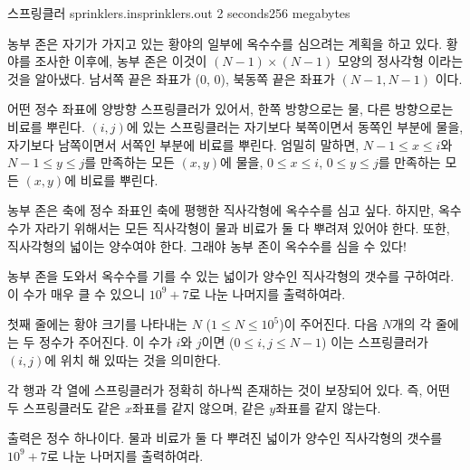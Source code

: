 \begin{problem}{스프링클러}
	{sprinklers.in}{sprinklers.out}
	{2 seconds}{256 megabytes}{}
	
	농부 존은 자기가 가지고 있는 황야의 일부에 옥수수를 심으려는 계획을 하고 있다. 황야를 조사한 이후에, 농부 존은 이것이 $(N-1) \times (N-1)$ 모양의 정사각형 이라는 것을 알아냈다. 남서쪽 끝은 좌표가 (0, 0), 북동쪽 끝은 좌표가 $(N-1, N-1)$ 이다.
	
	어떤 정수 좌표에 양방향 스프링클러가 있어서, 한쪽 방향으로는 물, 다른 방향으로는 비료를 뿌린다. $(i, j)$에 있는 스프링클러는 자기보다 북쪽이면서 동쪽인 부분에 물을, 자기보다 남쪽이면서 서쪽인 부분에 비료를 뿌린다. 엄밀히 말하면, $N-1 \le x \le i$와 $N-1 \le y \le j$를 만족하는 모든 $(x, y)$에 물을, $0 \le x \le i$, $0 \le y \le j$를 만족하는 모든 $(x, y)$에 비료를 뿌린다.
	
	
	농부 존은 축에 정수 좌표인 축에 평행한 직사각형에 옥수수를 심고 싶다. 하지만, 옥수수가 자라기 위해서는 모든 직사각형이 물과 비료가 둘 다 뿌려져 있어야 한다. 또한, 직사각형의 넓이는 양수여야 한다. 그래야 농부 존이 옥수수를 심을 수 있다!
	
	농부 존을 도와서 옥수수를 기를 수 있는 넓이가 양수인 직사각형의 갯수를 구하여라. 이 수가 매우 클 수 있으니 $10^9 + 7$로 나눈 나머지를 출력하여라.
	
	
	\InputFile
	
	첫째 줄에는 황야 크기를 나타내는 $N$ ($1 \le N \le 10^5$)이 주어진다. 다음 $N$개의 각 줄에는 두 정수가 주어진다. 이 수가 $i$와 $j$이면 ($0 \le i,j \le N-1$) 이는 스프링클러가 $(i, j)$에 위치 해 있따는 것을 의미한다.
	
	각 행과 각 열에 스프링클러가 정확히 하나씩 존재하는 것이 보장되어 있다. 즉, 어떤 두 스프링클러도 같은 $x$좌표를 같지 않으며, 같은 $y$좌표를 같지 않는다.

	\OutputFile
	
	출력은 정수 하나이다. 물과 비료가 둘 다 뿌려진 넓이가 양수인 직사각형의 갯수를 $10^9+7$로 나눈 나머지를 출력하여라.
	
	\Examples
		
	\begin{example}
	\end{example}

	
	
	
\end{problem}

